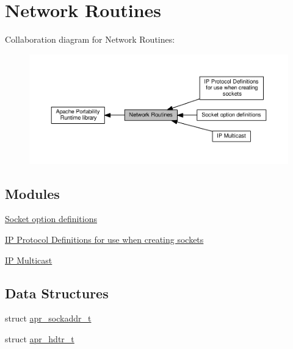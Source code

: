 \hypertarget{group__apr__network__io}{}\section{Network Routines}
\label{group__apr__network__io}
Collaboration diagram for Network Routines\+:
\nopagebreak
\begin{figure}[H]
\begin{center}
\leavevmode
\includegraphics[width=350pt]{group__apr__network__io}
\end{center}
\end{figure}
\subsection*{Modules}
\begin{DoxyCompactItemize}
\item 
\hyperlink{group__apr__sockopt}{Socket option definitions}
\item 
\hyperlink{group__IP__Proto}{I\+P Protocol Definitions for use when creating sockets}
\item 
\hyperlink{group__apr__mcast}{I\+P Multicast}
\end{DoxyCompactItemize}
\subsection*{Data Structures}
\begin{DoxyCompactItemize}
\item 
struct \hyperlink{structapr__sockaddr__t}{apr\+\_\+sockaddr\+\_\+t}
\item 
struct \hyperlink{structapr__hdtr__t}{apr\+\_\+hdtr\+\_\+t}
\end{DoxyCompactItemize}
